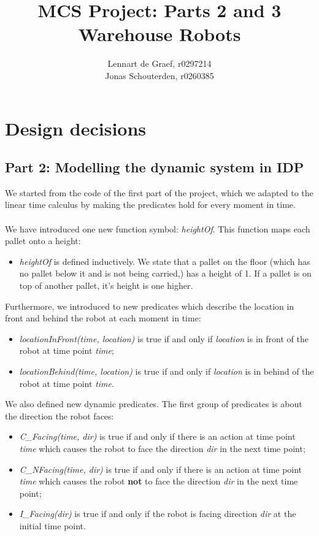 \documentclass[10pt,a4paper]{article}
\begin{document}
\author{Lennart de Graef, r0297214\\Jonas Schouterden, r0260385}
\title{MCS Project: Parts 2 and 3 \\
Warehouse Robots}
\maketitle

\section*{Design decisions}
\subsection*{Part 2: Modelling the dynamic system in IDP}
We started from the code of the first part of the project, which we adapted to the linear time calculus by making the predicates hold for every moment in time.\\
\\
We have introduced one new function symbol: \emph{heightOf}. This function maps each pallet onto a height:
\begin{itemize}
 \item \emph{heightOf} is defined inductively. We state that a pallet on the floor (which has no pallet below it and is not being carried,) has a height of 1. If a pallet is on top of another pallet, it's height is one higher.
\end{itemize}
Furthermore, we introduced to new predicates which describe the location in front and behind the robot at each moment in time:
\begin{itemize}
\item \emph{locationInFront(time, location)} is true if and only if \emph{location} is in front of the robot at time point \emph{time};
\item \emph{locationBehind(time, location)} is true if and only if \emph{location} is in behind of the robot at time point \emph{time}.
\end{itemize}
We also defined new dynamic predicates. The first group of predicates is about the direction the robot faces:
\begin{itemize}
  \item \emph{C\_Facing(time, dir)} is true if and only if there is an action at time point \emph{time} which causes the robot to face the direction \emph{dir} in the next time point;
  \item \emph{C\_NFacing(time, dir)} is true if and only if there is an action at time point \emph{time} which causes the robot \textbf{not} to face the direction \emph{dir} in the next time point;
  \item \emph{I\_Facing(dir)} is true if and only if the robot is facing direction \emph{dir} at the initial time point.
 \end{itemize}
 
\end{document}
